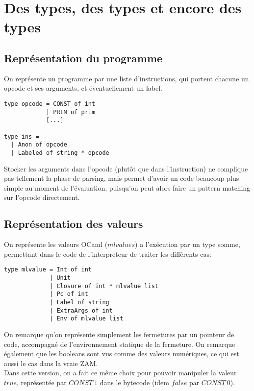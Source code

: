 \documentclass{article}
\begin{document}
\section{Des types, des types et encore des types}

\subsection{Représentation du programme}

On représente un programme par une liste d'instructions, qui portent chacune un opcode et ses arguments, et éventuellement un label.

\begin{lstlisting}
type opcode = CONST of int
            | PRIM of prim
            [...]

type ins =
  | Anon of opcode
  | Labeled of string * opcode
\end{lstlisting}

Stocker les arguments dans l'opcode (plutôt que dans l'instruction) ne complique pas tellement la phase de parsing, mais permet d'avoir un code beaucoup plus simple au moment de l'évaluation, puisqu'on peut alors faire un pattern matching sur l'opcode directement.

\subsection{Représentation des valeurs}

On représente les valeurs OCaml ($mlvalues$) a l'exécution par un type somme, permettant dans le code de l'interpreteur de traiter les différents cas:
\begin{lstlisting}
type mlvalue = Int of int
             | Unit
             | Closure of int * mlvalue list
             | Pc of int
             | Label of string
             | ExtraArgs of int
             | Env of mlvalue list
\end{lstlisting}
On remarque qu'on représente simplement les fermetures par un pointeur de code, accompagné de l'environnement statique de la fermeture. On remarque également que les booleans sont vus comme des valeurs numériques, ce qui est aussi le cas dans la vraie ZAM.\\
Dans cette version, on a fait ce même choix pour pouvoir manipuler la valeur $true$, représentée par $CONST\:1$ dans le bytecode (idem $false$ par $CONST\:0$).\\
\end{document}
